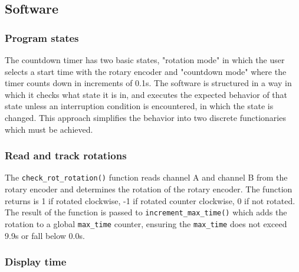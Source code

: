\documentclass[fleqn]{article}
\begin{document}
\subsection*{Software}
\subsubsection*{Program states}
The countdown timer has two basic states, "rotation mode" in which the user selects a start time with the rotary encoder and "countdown mode" where the timer counts down in increments of 0.1s. The software is structured in a way in which it checks what state it is in, and executes the expected behavior of that state unless an interruption condition is encountered, in which the state is changed. This approach simplifies the behavior into two discrete functionaries which must be achieved.

\subsubsection*{Read and track rotations}
The \verb|check_rot_rotation()| function reads channel A and channel B from the rotary encoder and determines the rotation of the rotary encoder. The function returns is 1 if rotated clockwise, -1 if rotated counter clockwise, 0 if not rotated. The result of the function is passed to \verb|increment_max_time()| which adds the rotation to a global \verb|max_time| counter, ensuring the \verb|max_time| does not exceed 9.9s or fall below 0.0s.

\subsubsection*{Display time}
\end{document}
